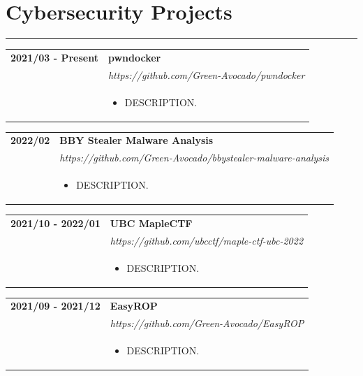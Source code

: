 \documentclass[letterpaper]{article}
\newcommand{\sect}[1]{\section*{#1}
                        {\color{cyan}
                        \rule{\textwidth}{1pt}
                        \vspace{-1ex}}}
\begin{document}
    \sect{Cybersecurity Projects}

        \begin{tabular}{p{} p{}} 
            \textbf{2021/03 - Present} & \textbf{pwndocker} \\
            & \emph{https://github.com/Green-Avocado/pwndocker} \\
            & \begin{itemize}
                \item DESCRIPTION.
            \end{itemize}
            \\
        \end{tabular}

        \begin{tabular}{p{} p{}} 
            \textbf{2022/02} & \textbf{BBY Stealer Malware Analysis} \\
            & \emph{https://github.com/Green-Avocado/bbystealer-malware-analysis} \\
            & \begin{itemize}
                \item DESCRIPTION.
            \end{itemize}
            \\
        \end{tabular}

        \begin{tabular}{p{} p{}} 
            \textbf{2021/10 - 2022/01} & \textbf{UBC MapleCTF} \\
            & \emph{https://github.com/ubcctf/maple-ctf-ubc-2022} \\
            & \begin{itemize}
                \item DESCRIPTION.
            \end{itemize}
            \\
        \end{tabular}

        \begin{tabular}{p{} p{}} 
            \textbf{2021/09 - 2021/12} & \textbf{EasyROP} \\
            & \emph{https://github.com/Green-Avocado/EasyROP} \\
            & \begin{itemize}
                \item DESCRIPTION.
            \end{itemize}
            \\
        \end{tabular}
\end{document}

